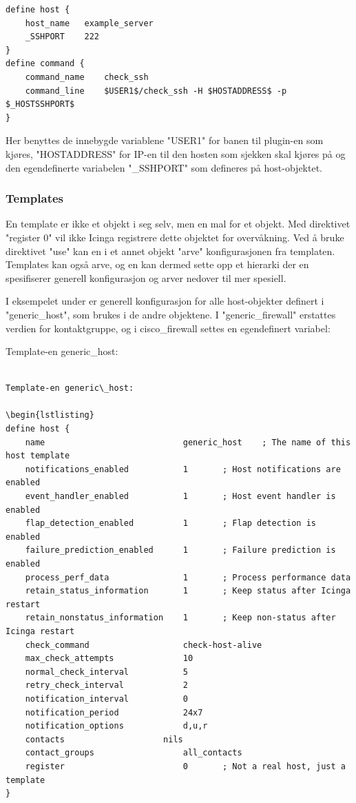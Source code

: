 \begin{lstlisting}
define host {
	host_name	example_server
	_SSHPORT	222
}
define command {
	command_name	check_ssh
	command_line	$USER1$/check_ssh -H $HOSTADDRESS$ -p $_HOSTSSHPORT$
}
\end{lstlisting}

Her benyttes de innebygde variablene "USER1" for banen til plugin-en som kjøres, "HOSTADDRESS" for IP-en til den hosten som sjekken skal kjøres på og den egendefinerte variabelen "\_SSHPORT" som defineres på host-objektet.

\subsubsection{Templates}
En template er ikke et objekt i seg selv, men en mal for et objekt. Med direktivet "register 0" vil ikke Icinga registrere dette objektet for overvåkning. Ved å bruke direktivet "use" kan en i et annet objekt "arve" konfigurasjonen fra templaten. Templates kan også arve, og en kan dermed sette opp et hierarki der en spesifiserer generell konfigurasjon og arver nedover til mer spesiell. 

I eksempelet under er generell konfigurasjon for alle host-objekter definert i "generic\_host", som brukes i de andre objektene. I "generic\_firewall" erstattes verdien for kontaktgruppe, og i cisco\_firewall settes en egendefinert variabel:

Template-en generic\_host: 

\begin{lstlisting}

Template-en generic\_host: 

\begin{lstlisting}
define host {
	name                            generic_host    ; The name of this host template
	notifications_enabled           1       ; Host notifications are enabled
	event_handler_enabled           1       ; Host event handler is enabled
	flap_detection_enabled          1       ; Flap detection is enabled
	failure_prediction_enabled      1       ; Failure prediction is enabled
	process_perf_data               1       ; Process performance data
	retain_status_information       1       ; Keep status after Icinga restart
	retain_nonstatus_information    1       ; Keep non-status after Icinga restart
	check_command                   check-host-alive
	max_check_attempts              10
	normal_check_interval           5
	retry_check_interval            2
	notification_interval           0
	notification_period             24x7
	notification_options            d,u,r
	contacts                	nils
	contact_groups                  all_contacts
	register                        0       ; Not a real host, just a template
}
\end{lstlisting}

